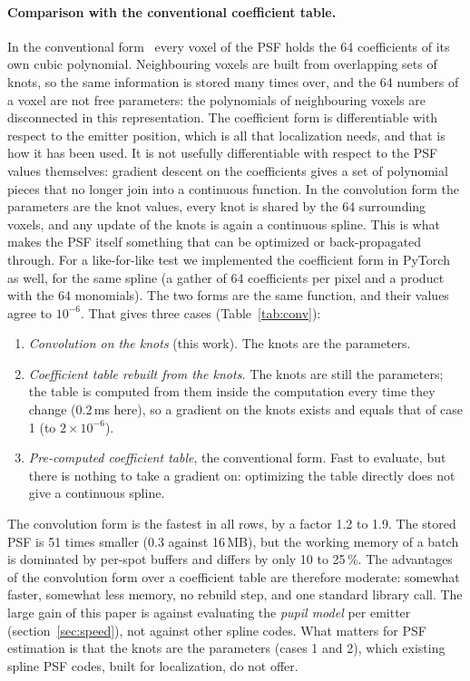\documentclass[11pt,a4paper]{article}
\begin{document}
\paragraph{Comparison with the conventional coefficient table.}
In the conventional form~\cite{babcock,cspline} every voxel of the PSF holds the 64 coefficients of its own
cubic polynomial. Neighbouring voxels are built from overlapping sets of knots, so the same information is
stored many times over, and the 64 numbers of a voxel are not free parameters: the polynomials of
neighbouring voxels are disconnected in this representation. The coefficient form is differentiable with
respect to the emitter position, which is all that localization needs, and that is how it has been used. It
is not usefully differentiable with respect to the PSF values themselves: gradient descent on the
coefficients gives a set of polynomial pieces that no longer join into a continuous function. In the
convolution form the parameters are the knot values, every knot is shared by the 64 surrounding voxels, and
any update of the knots is again a continuous spline. This is what makes the PSF itself something that can be
optimized or back-propagated through.
For a like-for-like test we implemented the coefficient form in PyTorch as well, for the same spline (a gather
of 64 coefficients per pixel and a product with the 64 monomials). The two forms are the same function, and
their values agree to $10^{-6}$. That gives three cases (Table~\ref{tab:conv}):
\begin{enumerate}\setlength\itemsep{0pt}
\item \emph{Convolution on the knots} (this work). The knots are the parameters.
\item \emph{Coefficient table rebuilt from the knots.} The knots are still the parameters; the table is
computed from them inside the computation every time they change (0.2\,ms here), so a gradient on the knots
exists and equals that of case 1 (to $2\times10^{-6}$).
\item \emph{Pre-computed coefficient table}, the conventional form. Fast to evaluate, but there is nothing to
take a gradient on: optimizing the table directly does not give a continuous spline.
\end{enumerate}
The convolution form is the fastest in all rows, by a factor 1.2 to 1.9. The stored PSF is 51 times smaller
(0.3 against 16\,MB), but the working memory of a batch is dominated by per-spot buffers and differs by only 10
to 25\,\%. The advantages of the convolution form over a coefficient table are therefore moderate: somewhat
faster, somewhat less memory, no rebuild step, and one standard library call. The large gain of this paper is
against evaluating the \emph{pupil model} per emitter (section~\ref{sec:speed}), not against other spline
codes. What matters for PSF estimation is that the knots are the parameters (cases 1 and 2), which existing
spline PSF codes, built for localization, do not offer.
\end{document}
